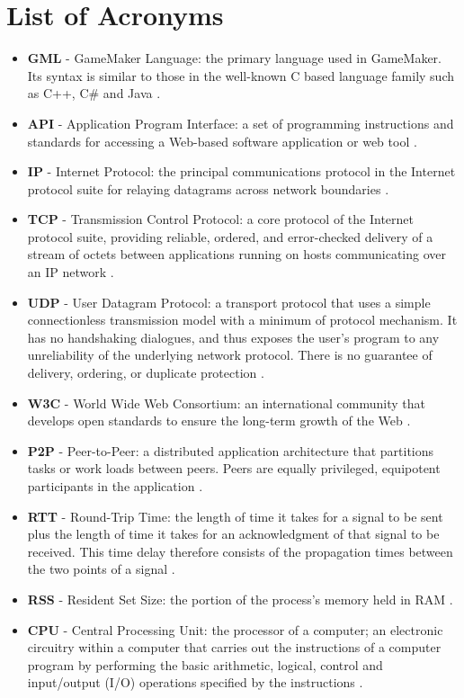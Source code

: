 \documentclass[bsc, 12pt, twoside, singlespacing, parskip, abbrevs, notimes, normalheadings, logo]{styles/infthesis}
\begin{document}
\section*{List of Acronyms}
\begin{itemize}
\item \textbf{GML} - GameMaker Language: the primary language used in GameMaker. Its syntax is similar to those in the well-known C based language family such as C++, C\# and Java \cite{def_GML}.
\item \textbf{API} - Application Program Interface: a set of programming instructions and standards for accessing a Web-based software application or web tool \cite{def_API}.
\item \textbf{IP} - Internet Protocol: the principal communications protocol in the Internet protocol suite for relaying datagrams across network boundaries \cite{def_IP}.
\item \textbf{TCP} - Transmission Control Protocol: a core protocol of the Internet protocol suite, providing reliable, ordered, and error-checked delivery of a stream of octets between applications running on hosts communicating over an IP network \cite{def_TCP}.
\item \textbf{UDP} - User Datagram Protocol: a transport protocol that uses a simple connectionless transmission model with a minimum of protocol mechanism. It has no handshaking dialogues, and thus exposes the user's program to any unreliability of the underlying network protocol. There is no guarantee of delivery, ordering, or duplicate protection \cite{def_UDP}.
\item \textbf{W3C} - World Wide Web Consortium: an international community that develops open standards to ensure the long-term growth of the Web \cite{def_W3C}.
\item \textbf{P2P} - Peer-to-Peer: a distributed application architecture that partitions tasks or work loads between peers. Peers are equally privileged, equipotent participants in the application \cite{def_P2P}.
\item \textbf{RTT} - Round-Trip Time: the length of time it takes for a signal to be sent plus the length of time it takes for an acknowledgment of that signal to be received. This time delay therefore consists of the propagation times between the two points of a signal \cite{def_RTT}.
\item \textbf{RSS} - Resident Set Size: the portion of the process's memory held in RAM \cite{def_RSS}.
\item \textbf{CPU} - Central Processing Unit: the processor of a computer; an electronic circuitry within a computer that carries out the instructions of a computer program by performing the basic arithmetic, logical, control and input/output (I/O) operations specified by the instructions \cite{def_CPU}.

\end{itemize}
\end{document}
